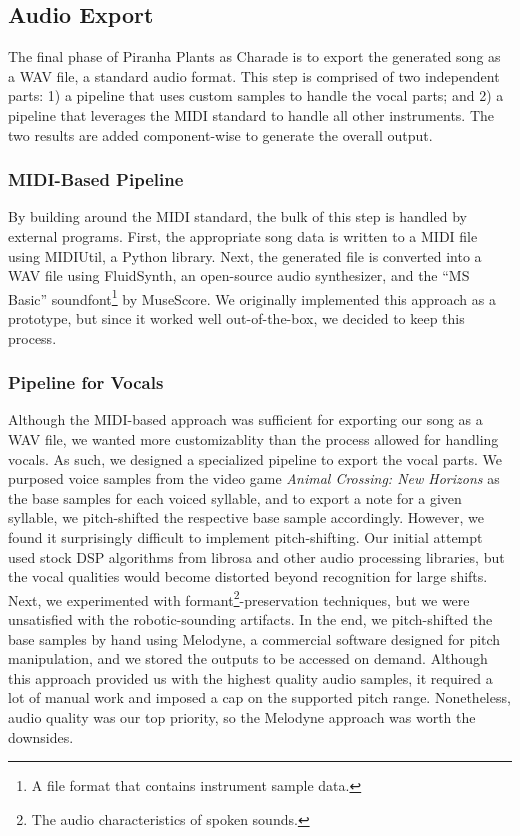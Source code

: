 \subsection{Audio Export}

The final phase of Piranha Plants as Charade is to export the generated song as a WAV file, a standard audio format. This step is comprised of two independent parts: 1) a pipeline that uses custom samples to handle the vocal parts; and 2) a pipeline that leverages the MIDI standard to handle all other instruments. The two results are added component-wise to generate the overall output.

\subsubsection{MIDI-Based Pipeline}

By building around the MIDI standard, the bulk of this step is handled by external programs. First, the appropriate song data is written to a MIDI file using MIDIUtil, a Python library. Next, the generated file is converted into a WAV file using FluidSynth, an open-source audio synthesizer, and the ``MS Basic'' soundfont\footnote{A file format that contains instrument sample data.} by MuseScore. We originally implemented this approach as a prototype, but since it worked well out-of-the-box, we decided to keep this process.

\subsubsection{Pipeline for Vocals}

Although the MIDI-based approach was sufficient for exporting our song as a WAV file, we wanted more customizablity than the process allowed for handling vocals. As such, we designed a specialized pipeline to export the vocal parts. We purposed voice samples from the video game \emph{Animal Crossing: New Horizons} as the base samples for each voiced syllable, and to export a note for a given syllable, we pitch-shifted the respective base sample accordingly. However, we found it surprisingly difficult to implement pitch-shifting. Our initial attempt used stock DSP algorithms from librosa and other audio processing libraries, but the vocal qualities would become distorted beyond recognition for large shifts. Next, we experimented with formant\footnote{The audio characteristics of spoken sounds.}-preservation techniques, but we were unsatisfied with the robotic-sounding artifacts. In the end, we pitch-shifted the base samples by hand using Melodyne, a commercial software designed for pitch manipulation, and we stored the outputs to be accessed on demand. Although this approach provided us with the highest quality audio samples, it required a lot of manual work and imposed a cap on the supported pitch range. Nonetheless, audio quality was our top priority, so the Melodyne approach was worth the downsides.